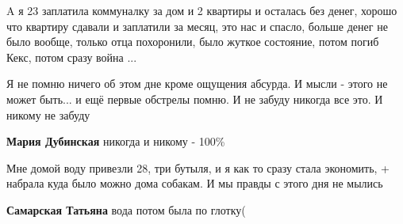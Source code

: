 
A я 23 заплатила коммуналку за дом и 2 квартиры и осталась без денег, хорошо
что квартиру сдавали и заплатили за месяц, это нас и спасло, больше денег не
было вообще, только отца похоронили, было жуткое состояние, потом погиб Кекс,
потом сразу война ...


Я не помню ничего об этом дне кроме ощущения абсурда. И мысли - этого не может
быть... и ещё первые обстрелы помню. И не забуду никогда все это. И никому не
забуду

\begin{itemize} %
\textbf{Мария Дубинская} никогда и никому - 100\%
\end{itemize} %


Мне домой воду привезли 28, три бутыля, и я как то сразу стала экономить, +
набрала куда было можно дома собакам. И мы правды с этого дня не мылись 🙈

\begin{itemize} %
\textbf{Самарская Татьяна} вода потом была по глотку(
\end{itemize} %
